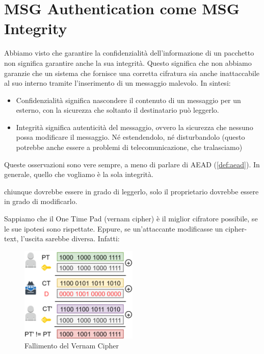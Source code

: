\chapter{MSG Authentication come MSG Integrity}
Abbiamo visto che garantire la confidenzialità dell'informazione di un pacchetto non significa garantire anche la sua integrità. Questo significa che non abbiamo garanzie che un sistema che fornisce una corretta cifratura sia anche inattaccabile al suo interno tramite l'inserimento di un messaggio malevolo. In sintesi:
\begin{itemize}
    \item Confidenzialità significa nascondere il contenuto di un messaggio per un esterno, con la sicurezza che soltanto il destinatario può leggerlo.
    \item Integrità significa autenticità del messaggio, ovvero la sicurezza che nessuno possa modificare il messaggio. Né estendendolo, né disturbandolo (questo potrebbe anche essere a problemi di telecomunicazione, che tralasciamo)
\end{itemize}
Queste osservazioni sono vere sempre, a meno di parlare di AEAD (\ref{def:aead}). In generale, quello che vogliamo è la sola integrità. 
\begin{example}[ Il Curriculum] chiunque dovrebbe essere in grado di leggerlo, solo il proprietario dovrebbe essere in grado di modificarlo.
\end{example}
\begin{example}
Sappiamo che il One Time Pad (vernam cipher) è il miglior cifratore possibile, se le sue ipotesi sono rispettate. Eppure, se un'attaccante modificasse un cipher-text, l'uscita sarebbe diversa. Infatti:
\begin{figure}[hb]
    \centering
    \includegraphics[width=0.5\textwidth]{image/vernaminteg.png}
    \caption{Fallimento del Vernam Cipher}
    \label{fig:vernamfail}
\end{figure}
\end{example}\pagebreak
